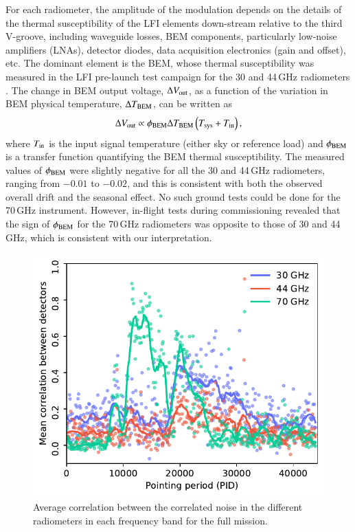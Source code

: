 \documentclass[twocolumn]{aa}
\begin{document}
For each radiometer, the amplitude of the modulation depends on the
details of the thermal susceptibility of the LFI elements down-stream
relative to the third V-groove, including waveguide losses, BEM
components, particularly low-noise amplifiers (LNAs), detector diodes,
data acquisition electronics (gain and offset), etc.
The dominant element is the BEM, whose
thermal susceptibility was measured in the LFI pre-launch test
campaign for the 30 and 44\,GHz radiometers \citep{villa2010}. The
change in BEM output voltage, $\Delta V_{\rm out}$, as a function of
the variation in BEM physical temperature, $\Delta T_{\rm BEM}$, can
be written as
\begin{equation}
\Delta V_{\rm out} \propto \phi_{\rm BEM} \Delta T_{\rm BEM}
\left(T_{\rm sys} + T_{\rm in} \right),
\end{equation}
where $T_{\rm in}$ is the input signal temperature (either sky or
reference load) and $\phi_{\rm BEM}$ is a transfer function
quantifying the BEM thermal susceptibility. The measured values of
$\phi_{\rm BEM}$ \citep{villa2010} were slightly negative for all the
30 and 44\,GHz radiometers, ranging from $-0.01$ to $-0.02$, and this
is consistent with both the observed overall drift and the seasonal
effect. No such ground tests could be done for the 70\,GHz instrument.
However, in-flight tests during commissioning \citep{Cuttaia2011}
revealed that the sign of $\phi_{\rm BEM}$ for the 70\,GHz radiometers
was opposite to those of 30 and 44\,GHz, which is consistent with our
interpretation.
\begin{figure}
	\begin{center}
		\includegraphics[width=\linewidth]{figs/mean_corr_vs_pid_final.pdf}
	\end{center}
	\caption{Average correlation between the correlated noise in the different radiometers in each frequency band for the full mission. 
		\label{fig:corr_v_pid}}
\end{figure}
\end{document}
